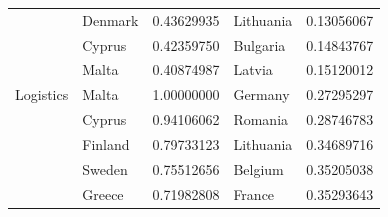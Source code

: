 \begin{table}[htbp]
\begin{tabular}{@{}lllll@{}}
   & Denmark & 0.43629935 & Lithuania & 0.13056067 \\
   & Cyprus & 0.42359750 & Bulgaria & 0.14843767 \\
   & Malta & 0.40874987 & Latvia & 0.15120012 \\
\addlinespace
  Logistics & Malta & 1.00000000 & Germany & 0.27295297 \\
   & Cyprus & 0.94106062 & Romania & 0.28746783 \\
   & Finland & 0.79733123 & Lithuania & 0.34689716 \\
   & Sweden & 0.75512656 & Belgium & 0.35205038 \\
   & Greece & 0.71982808 & France & 0.35293643 \\
\bottomrule
\end{tabular}
\end{table}